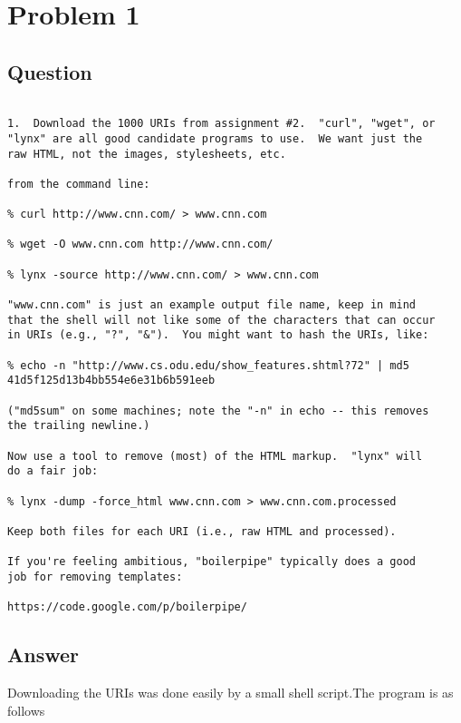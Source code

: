 \section{Problem 1}
\label{part1}
\subsection*{Question}
\begingroup

\begin{verbatim}

1.  Download the 1000 URIs from assignment #2.  "curl", "wget", or
"lynx" are all good candidate programs to use.  We want just the
raw HTML, not the images, stylesheets, etc.

from the command line:

% curl http://www.cnn.com/ > www.cnn.com

% wget -O www.cnn.com http://www.cnn.com/

% lynx -source http://www.cnn.com/ > www.cnn.com

"www.cnn.com" is just an example output file name, keep in mind
that the shell will not like some of the characters that can occur
in URIs (e.g., "?", "&").  You might want to hash the URIs, like:

% echo -n "http://www.cs.odu.edu/show_features.shtml?72" | md5
41d5f125d13b4bb554e6e31b6b591eeb

("md5sum" on some machines; note the "-n" in echo -- this removes
the trailing newline.) 

Now use a tool to remove (most) of the HTML markup.  "lynx" will
do a fair job:

% lynx -dump -force_html www.cnn.com > www.cnn.com.processed

Keep both files for each URI (i.e., raw HTML and processed). 

If you're feeling ambitious, "boilerpipe" typically does a good
job for removing templates:

https://code.google.com/p/boilerpipe/

\end{verbatim}
\newpage
\subsection*{Answer}

Downloading the URIs was done easily by a small shell script.The program is as follows  



